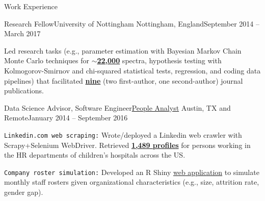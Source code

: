 \documentclass{article}
\newlength{\tabin}
\newlength{\secsep}
\newcommand{\lineunder}{\vspace*{-8pt} \\ \hspace*{-6pt} \hrulefill \\ \vspace*{-15pt}}
\newenvironment{tabbedsection}[1]{
  \begin{list}{}{
      \setlength{\itemsep}{0pt}
      \setlength{\labelsep}{0pt}
      \setlength{\labelwidth}{0pt}
      \setlength{\leftmargin}{\tabin}
      \setlength{\rightmargin}{\tabin}
      \setlength{\listparindent}{0pt}
      \setlength{\parsep}{0pt}
      \setlength{\parskip}{0pt}
      \setlength{\partopsep}{0pt}
      \setlength{\topsep}{#1}
    }
  \item[]
}{\end{list}}
\newenvironment{resume_section}[1]{
  \filbreak
  \vspace{2\secsep}
  \textsc{\large#1}
  \lineunder
  \begin{tabbedsection}{\secsep}
}{\end{tabbedsection}}
\newenvironment{subitems}{
  \renewcommand{\labelitemi}{-}
  \begin{itemize}
      \setlength{\labelsep}{1em}
}{\end{itemize}}
\newenvironment{resume_employer}[4]{
  \vspace{\secsep}
  \textbf{#1} \\ 
  \indent {\small #2} \hfill {\footnotesize#3 (#4)}
  \begin{tabbedsection}{0pt}
  \begin{subitems}
}{\end{subitems}\end{tabbedsection}}
\begin{document}
\begin{resume_section}{Work Experience}
  \begin{resume_employer}{Research Fellow}{University of Nottingham}
  {Nottingham, England}{September 2014 -- March 2017}
    \item Led research tasks (e.g., parameter estimation with Bayesian Markov Chain Monte Carlo techniques for \underline{\textbf{$\sim$22,000}} spectra, hypothesis testing with Kolmogorov-Smirnov and chi-squared statistical tests, regression, and coding data pipelines) that facilitated \underline{\textbf{nine}} (two first-author, one second-author) journal publications.
  \end{resume_employer}

  \begin{resume_employer}{Data Science Advisor, Software Engineer}{\href{http://peopleanalyst.com}{People Analyst}}
  {Austin, TX and Remote}{January 2014 -- September 2016}
   \item \texttt{Linkedin.com web scraping:} Wrote/deployed a Linkedin web crawler with Scrapy+Selenium WebDriver. Retrieved \underline{\textbf{1,489 profiles}} for persons working in the HR departments of children's hospitals across the US.
   \item \texttt{Company roster simulation:} Developed an R Shiny \href{https://peopleflow.shinyapps.io/Roster}{web application} to simulate monthly staff rosters given organizational characteristics (e.g., size, attrition rate, gender gap).
  \end{resume_employer}


\end{resume_section}
\end{document}
